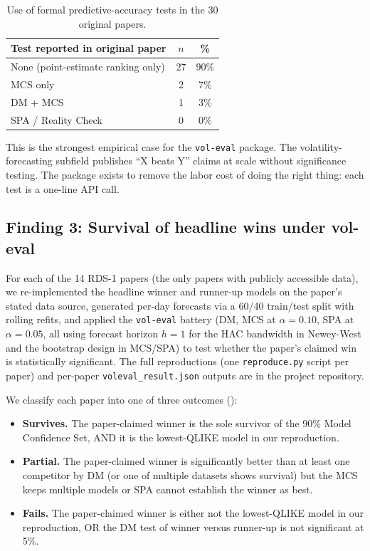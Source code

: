 \begin{table}[H]
\centering
\caption{Use of formal predictive-accuracy tests in the 30 original papers.}\label{tab:phase2_sigtest}
\begin{tabular}{lcc}
\toprule
Test reported in original paper & $n$ & \% \\
\midrule
None (point-estimate ranking only) & 27 & 90\% \\
MCS only & 2 & 7\% \\
DM + MCS & 1 & 3\% \\
SPA / Reality Check & 0 & 0\% \\
\bottomrule
\end{tabular}
\end{table}

This is the strongest empirical case for the \texttt{vol-eval} package. The volatility-forecasting subfield publishes ``X beats Y'' claims at scale without significance testing. The package exists to remove the labor cost of doing the right thing: each test is a one-line API call.

\subsection{Finding 3: Survival of headline wins under vol-eval}\label{sec:phase2_survival}

For each of the 14 RDS-1 papers (the only papers with publicly accessible data), we re-implemented the headline winner and runner-up models on the paper's stated data source, generated per-day forecasts via a 60/40 train/test split with rolling refits, and applied the \texttt{vol-eval} battery (DM, MCS at $\alpha = 0.10$, SPA at $\alpha = 0.05$, all using forecast horizon $h = 1$ for the HAC bandwidth in Newey-West and the bootstrap design in MCS/SPA) to test whether the paper's claimed win is statistically significant. The full reproductions (one \texttt{reproduce.py} script per paper) and per-paper \texttt{voleval\_result.json} outputs are in the project repository.

We classify each paper into one of three outcomes ():

\begin{itemize}[leftmargin=*]
    \item \textbf{Survives.} The paper-claimed winner is the sole survivor of the 90\% Model Confidence Set, AND it is the lowest-QLIKE model in our reproduction.
    \item \textbf{Partial.} The paper-claimed winner is significantly better than at least one competitor by DM (or one of multiple datasets shows survival) but the MCS keeps multiple models or SPA cannot establish the winner as best.
    \item \textbf{Fails.} The paper-claimed winner is either not the lowest-QLIKE model in our reproduction, OR the DM test of winner versus runner-up is not significant at 5\%.
\end{itemize}

